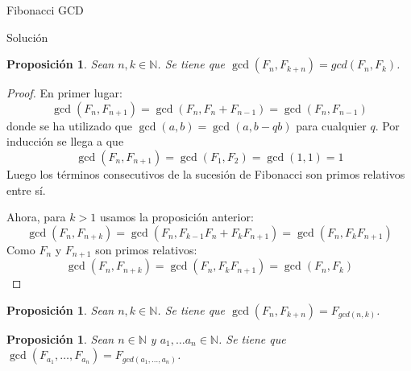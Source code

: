 \documentclass{article}
\theoremstyle{theorem-style}  %
\newtheorem{proposition}[theorem]{Proposición}
\theoremstyle{definition}
\theoremstyle{example-style}
\begin{document}
\begin{section}{Fibonacci  GCD}
\begin{subsection}{Solución}
        \begin{proposition}
            Sean $n, k \in \mathbb{N}$. Se tiene que $\gcd(F_n, F_{k+n}) = gcd(F_n, F_k)$. 
        \end{proposition}
    
        \begin{proof}
            En primer lugar: 
            $$ \gcd(F_n, F_{n+1}) = \gcd(F_{n}, F_{n}+F_{n-1}) = \gcd(F_{n}, F_{n-1}) $$
            donde se ha utilizado que $\gcd(a,b) = \gcd(a,b-qb)$ para cualquier $q$. Por inducción se llega a que 
            $$ \gcd(F_n, F_{n+1}) = \gcd(F_{1}, F_{2}) = \gcd(1,1) = 1 $$
            Luego los términos consecutivos de la sucesión de Fibonacci son primos relativos entre sí.
                        
            Ahora, para $k > 1$ usamos la proposición anterior:
            $$ \gcd(F_n, F_{n+k}) = \gcd(F_n, F_{k-1}F_n + F_k F_{n+1}) = \gcd(F_n, F_k F_{n+1}) $$
            Como $F_n$ y $F_{n+1}$ son primos relativos:
            $$ \gcd(F_n, F_{n+k}) = \gcd(F_n, F_k F_{n+1}) = \gcd(F_n, F_k) $$
            
        \end{proof}
        
        \begin{proposition}
            Sean $n, k \in \mathbb{N}$. Se tiene que $\gcd(F_n, F_{k+n}) = F_{gcd(n, k)}$. 
        \end{proposition}
        
        \begin{proposition}
            Sean $n \in \mathbb{N}$ y $a_1, \dots a_n \in \mathbb{N}$. Se tiene que 
            $\gcd(F_{a_1}, \dots, F_{a_n}) = F_{gcd(a_1, \dots, a_n)}$. 
        \end{proposition}

    
    \end{subsection}
    

\end{section}
\end{document}
